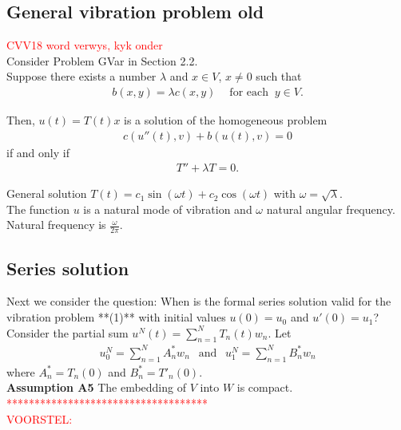 \documentclass[../../main.tex]{subfiles}
\begin{document}
\subsection{General vibration problem old}

\textcolor{red}{CVV18 word verwys, kyk onder}\\

Consider Problem GVar in Section 2.2.\\

Suppose there exists a number $\lambda$ and $x \in V$, $x \neq 0$ such that
\begin{eqnarray*}
	b(x,y) = \lambda c(x,y) \ \ \ \ \textrm{ for each } \ y \in V.
\end{eqnarray*}

Then, $u(t) = T(t)x$ is a solution of the homogeneous problem
\begin{eqnarray*}
	c(u''(t),v) + b(u(t),v) = 0
\end{eqnarray*}
if and only if
\begin{eqnarray}
	T''  + \lambda T = 0.
\end{eqnarray}

General solution $T(t) = c_1 \sin(\omega t) + c_2 \cos(\omega t)$ with $\omega = \sqrt{\lambda}$.\\

The function $u$ is a natural mode of vibration and $\omega$ natural angular frequency. Natural frequency is $\frac{\omega}{2 \pi}$.

\subsection*{Series solution}\label{ssec:existence:SeriesSolution}
Next we consider the question: When is the formal series solution valid for the vibration problem **(1)** with initial values $u(0) = u_0$ and $u'(0) = u_1$?\\

Consider the partial sum $u^{N}(t) = \sum_{n=1}^{N} T_{n}(t)w_n$. Let
\begin{eqnarray*}
	u_0^{N} = \sum_{n=1}^{N} A^*_n w_n \ \ \textrm{ and } \ \ u_{1}^{N} =\sum_{n=1}^{N} B^*_n w_n
\end{eqnarray*} where $A^*_n = T_n(0)$ and $B^*_n = T'_n(0)$.\\

\textbf{Assumption A5} The embedding of $V$ into $W$ is compact.\\


\textcolor{red}{************************************}\\
\textcolor{red}{VOORSTEL:}
\end{document}
